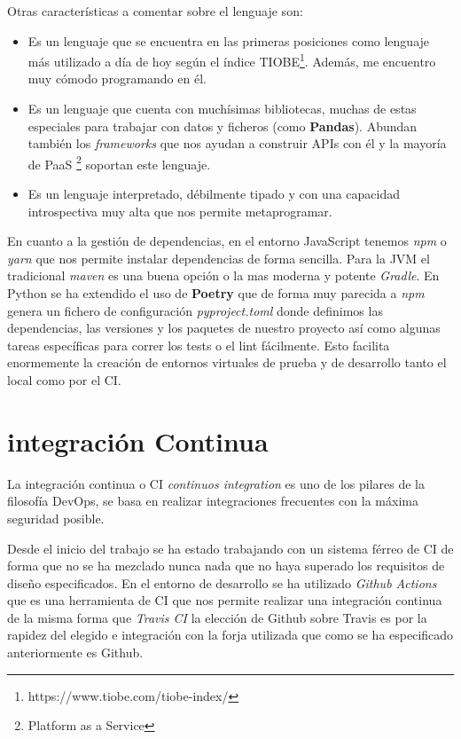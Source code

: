 Otras características a comentar sobre el lenguaje son:
\begin{itemize}
    \item Es un lenguaje que se encuentra en las primeras posiciones como lenguaje más
    utilizado a día de hoy según el índice
    TIOBE\footnote{https://www.tiobe.com/tiobe-index/}. Además, me encuentro muy cómodo
    programando en él.
    \item Es un lenguaje que cuenta con muchísimas bibliotecas, muchas de estas especiales
    para trabajar con datos y ficheros (como \textbf{Pandas}). Abundan también los
    \textit{frameworks} que nos ayudan a construir APIs con él y la mayoría de PaaS
    \footnote{Platform as a Service} soportan este lenguaje.
    \item Es un lenguaje interpretado, débilmente tipado y con una capacidad introspectiva
    muy alta que nos permite metaprogramar.
\end{itemize}

En cuanto a la gestión de dependencias, en el entorno JavaScript tenemos \textit{npm} o
\textit{yarn} que nos permite instalar dependencias de forma sencilla. Para la JVM el
tradicional \textit{maven} es una buena opción o la mas moderna y potente \textit{Gradle}.
En Python se ha extendido el uso de \textbf{Poetry} que de forma muy parecida a
\textit{npm} genera un fichero de configuración \textit{pyproject.toml} donde definimos
las dependencias, las versiones y los paquetes de nuestro proyecto así como algunas tareas
específicas para correr los tests o el lint fácilmente. Esto facilita enormemente la
creación de entornos virtuales de prueba y de desarrollo tanto el local como por el CI.


\section{integración Continua}
La integración continua o CI \textit{continuos integration} es uno de los pilares de la
filosofía DevOps, se basa en realizar integraciones frecuentes con la máxima seguridad
posible.

Desde el inicio del trabajo se ha estado trabajando con un sistema férreo de CI de forma
que no se ha mezclado nunca nada que no haya superado los requisitos de diseño
especificados. En el entorno de desarrollo se ha utilizado \textit{Github Actions} que es
una herramienta de CI que nos permite realizar una integración continua de la misma forma
que \textit{Travis CI} la elección de Github sobre Travis es por la rapidez del elegido e
integración con la forja utilizada que como se ha especificado anteriormente es Github.

